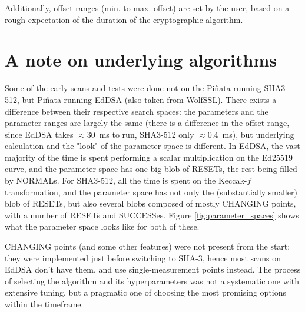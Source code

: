 \documentclass[times, utf8, diplomski]{fer}
\begin{document}
Additionally, offset ranges (min. to max. offset) are set by the user,
based on a rough expectation of the duration of the cryptographic algorithm.



\section{A note on underlying algorithms}\label{sec:note_on_algorithms}
Some of the early scans and tests were done not on the Piñata running SHA3-512,
but Piñata running EdDSA (also taken from WolfSSL). There exists a difference
between their respective search spaces: the parameters and the parameter ranges
are largely the same (there is a difference in the offset range, since EdDSA
takes $\approx$\SI{30}{\milli\second} to run, SHA3-512 only $\approx$\SI{0.4}{\milli\second}),
but underlying calculation and the "look" of the parameter space is different.
In EdDSA, the vast majority of the time is spent performing a scalar
multiplication on the Ed25519 curve, and the parameter space has one big
blob of RESETs, the rest being filled by NORMALs. For SHA3-512, all the
time is spent on the Keccak-$f$ transformation, and the parameter space
has not only the (substantially smaller) blob of RESETs, but also several
blobs composed of mostly CHANGING points, with a number of RESETs and SUCCESSes.
Figure \ref{fig:parameter_spaces} shows what the parameter space looks like
for both of these.

CHANGING points (and some other features) were not present from the start;
they were implemented just before switching to SHA-3, hence most scans on EdDSA
don't have them, and use single-measurement points instead. The process of
selecting the algorithm and its hyperparameters was not a systematic one
with extensive tuning, but a pragmatic one of choosing the most promising
options within the timeframe.
\end{document}
